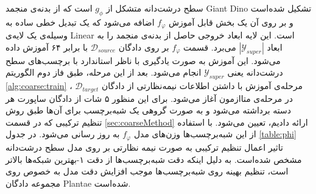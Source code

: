 سطح درشت‌دانه متشکل از 
$g_\phi$
است که از بدنه‌ی منجمد 
Giant Dino
تشکیل شده‌است و بر روی آن یک بخش قابل آموزش 
$f_\varphi$
اضافه می‌شود که یک تبدیل خطی ساده به وسیله‌ی یک لایه‌ی Linear است. این لایه ابعاد خروجی حاصل از بدنه‌ی منجمد را به ابعاد 
$|\mathcal{Y}_{super}|$
می‌برد. قسمت 
$f_\varphi$
بر روی دادگان 
$\mathcal{D}_{source}$
با 
برابر ۶۴ آموزش داده می‌شود. این آموزش به صورت یادگیری با ناظر استاندارد با برچسب‌های سطح درشت‌دانه یعنی 
$\mathcal{Y}_{super}$
انجام می‌شود. بعد از این مرحله، طبق فاز دوم الگوریتم
\ref{alg:coarse:train}
، مرحله‌ی آموزش با داشتن اطلاعات نیمه‌نظارتی از دادگان 
$\mathcal{D}_{target}$
در مرحله‌ی متا‌ازمون آغاز می‌شود. برای این منظور ۵ شات از دادگان ساپورت هر دسته برداشته می‌شود و به صورت گروهی یک شبه‌برچسب برای آن‌ها طبق روش تنظیم ترکیبی که در قسمت 
\ref{sec:coarseMethod}
ارائه دادیم، تعیین می‌شود. با استفاده از این شبه‌برچسب‌ها وزن‌های مدل
$f_\varphi$
 به روز رسانی می‌شود. در جدول
 \ref{table:phi}
 تاثیر اعمال تنظیم ترکیبی به صورت نیمه نظارتی بر روی
 مدل سطح درشت‌دانه مشخص شده‌است. به دلیل اینکه دقت شبه‌برچسب‌ها از دقت ۱-بهترین شبکه‌ها بالاتر است، تنظیم بهینه روی شبه‌برچسب‌ها موجب افزایش دقت مدل به خصوص روی مجموعه دادگان Plantae شده‌است.
 
